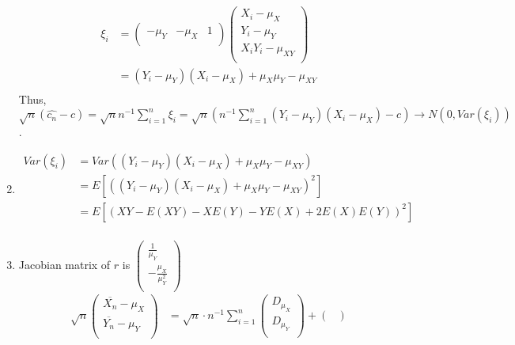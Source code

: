 \documentclass[12pt,letterpaper, onecolumn]{exam}
\begin{document}
\begin{questions}
\begin{solution}
\begin{enumerate}
        
            \begin{align*}
            \xi_i & = \begin{pmatrix}
                 -\mu_Y & -\mu_X &  1 \\
            \end{pmatrix} \begin{pmatrix}
                    X_i - \mu_X \\
                    Y_i - \mu_Y \\
                     X_iY_i - \mu_{XY} \\
                    \end{pmatrix} \\
                & = (Y_i-\mu_Y)(X_i-\mu_X)+\mu_X\mu_Y-\mu_{XY} \\    
            \end{align*}
            Thus, $\sqrt{n}(\hat{c_n}-c) = \sqrt{n}n^{-1}\sum_{i=1}^n \xi_i = \sqrt{n}(n^{-1}\sum_{i=1}^n (Y_i-\mu_Y)(X_i-\mu_X)-c) \rightarrow  N(0, Var(\xi_i))$. 
        \item  \begin{align*}
        Var(\xi_i) & = Var((Y_i-\mu_Y)(X_i-\mu_X)+\mu_X\mu_Y-\mu_{XY}) \\
        & = E[((Y_i-\mu_Y)(X_i-\mu_X)+\mu_X\mu_Y-\mu_{XY})^2] \\
        & = E[(XY-E(XY)-XE(Y)-YE(X)+2E(X)E(Y))^2] \\
            \end{align*} 
        \item  Jacobian matrix of $r$ is $\begin{pmatrix}
            \frac{1}{\mu_Y} \\
            -\frac{\mu_X}{\mu_Y^2}\\
        \end{pmatrix}$
        \begin{align*}
            \sqrt{n} \begin{pmatrix}
                \overline{X_n} - \mu_X \\
                \overline{Y_n} - \mu_Y \\
            \end{pmatrix} &  = \sqrt{n} \cdot n^{-1} \sum_{i=1}^n \begin{pmatrix}
                D_{\mu_X} \\
                D_{\mu_Y} \\
            \end{pmatrix} + \begin{pmatrix}

\end{pmatrix}
\end{align*}
\end{enumerate}
\end{solution}
\end{questions}
\end{document}
